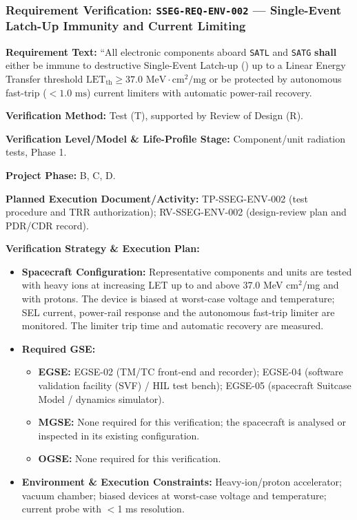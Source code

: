 \subsubsection{Requirement Verification: \texttt{SSEG-REQ-ENV-002} --- Single-Event Latch-Up Immunity and Current Limiting}
\label{ver:SSEG-REQ-ENV-002}
\textbf{Requirement Text:} ``All electronic components aboard \texttt{SATL} and \texttt{SATG} \textbf{shall} either be immune to destructive Single-Event Latch-up () up to a Linear Energy Transfer threshold $\text{LET}_{\text{th}} \ge 37.0\text{ MeV}\cdot\text{cm}^2/\text{mg}$ or be protected by autonomous fast-trip ($< 1.0\text{ ms}$) current limiters with automatic power-rail recovery.
\par\textbf{Verification Method:} Test (T), supported by Review of Design (R).
\par\textbf{Verification Level/Model \& Life-Profile Stage:} Component/unit radiation tests, Phase 1.
\par\textbf{Project Phase:} B, C, D.
\par\textbf{Planned Execution Document/Activity:} TP-SSEG-ENV-002 (test procedure and TRR authorization); RV-SSEG-ENV-002 (design-review plan and PDR/CDR record).
\par\textbf{Verification Strategy \& Execution Plan:}
\begin{itemize}
\item \textbf{Spacecraft Configuration:} Representative components and units are tested with heavy ions at increasing LET up to and above 37.0 MeV cm$^2$/mg and with protons. The device is biased at worst-case voltage and temperature; SEL current, power-rail response and the autonomous fast-trip limiter are monitored. The limiter trip time and automatic recovery are measured.
\item \textbf{Required GSE:}
\begin{itemize}
\item \textbf{EGSE:} EGSE-02 (TM/TC front-end and recorder); EGSE-04 (software validation facility (SVF) / HIL test bench); EGSE-05 (spacecraft Suitcase Model / dynamics simulator).
\item \textbf{MGSE:} None required for this verification; the spacecraft is analysed or inspected in its existing configuration.
\item \textbf{OGSE:} None required for this verification.
\end{itemize}
\item \textbf{Environment \& Execution Constraints:} Heavy-ion/proton accelerator; vacuum chamber; biased devices at worst-case voltage and temperature; current probe with $<$1 ms resolution.
\end{itemize}
